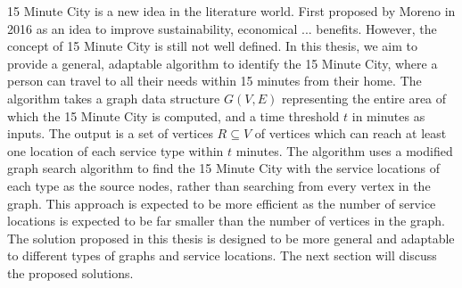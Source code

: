 \begin{Abstract}
\begin{changemargin}{1cm}{1cm}

15 Minute City is a new idea in the literature world. First proposed by Moreno in 2016 as an idea to improve sustainability, economical ... benefits. However, the concept of 15 Minute City is still not well defined. In this thesis, we aim to provide a general, adaptable algorithm to identify the 15 Minute City, where a person can travel to all their needs within 15 minutes from their home. The algorithm takes a graph data structure $G(V,E)$ representing the entire area of which the 15 Minute City is computed, and a time threshold $t$ in minutes as inputs. The output is a set of vertices $R\subseteq V$ of vertices which can reach at least one location of each service type within $t$ minutes. The algorithm uses a modified graph search algorithm to find the 15 Minute City with the service locations of each type as the source nodes, rather than searching from every vertex in the graph. This approach is expected to be more efficient as the number of service locations is expected to be far smaller than the number of vertices in the graph. The solution proposed in this thesis is designed to be more general and adaptable to different types of graphs and service locations. The next section will discuss the proposed solutions.

\end{changemargin}
\end{Abstract}